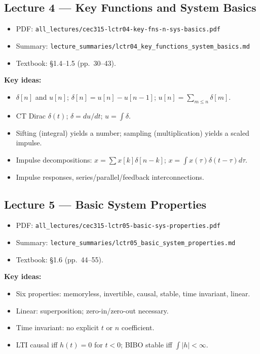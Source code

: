 \documentclass[11pt]{article}
\begin{document}
\subsection{Lecture 4 --- Key Functions and System Basics}
\begin{itemize}[leftmargin=*]
  \item PDF: \texttt{all\_lectures/cec315-lctr04-key-fns-n-sys-basics.pdf}
  \item Summary: \texttt{lecture\_summaries/lctr04\_key\_functions\_system\_basics.md}
  \item Textbook: \S 1.4--1.5 (pp.~30--43).
\end{itemize}
\textbf{Key ideas:}
\begin{itemize}[leftmargin=*]
  \item $\delta[n]$ and $u[n]$; $\delta[n]=u[n]-u[n-1]$; $u[n]=\sum_{m\le n}\delta[m]$.
  \item CT Dirac $\delta(t)$; $\delta=du/dt$; $u=\int\delta$.
  \item Sifting (integral) yields a number; sampling (multiplication) yields a scaled impulse.
  \item Impulse decompositions: $x=\sum x[k]\delta[n-k]$; $x=\int x(\tau)\delta(t-\tau)d\tau$.
  \item Impulse responses, series/parallel/feedback interconnections.
\end{itemize}

\subsection{Lecture 5 --- Basic System Properties}
\begin{itemize}[leftmargin=*]
  \item PDF: \texttt{all\_lectures/cec315-lctr05-basic-sys-properties.pdf}
  \item Summary: \texttt{lecture\_summaries/lctr05\_basic\_system\_properties.md}
  \item Textbook: \S 1.6 (pp.~44--55).
\end{itemize}
\textbf{Key ideas:}
\begin{itemize}[leftmargin=*]
  \item Six properties: memoryless, invertible, causal, stable, time invariant, linear.
  \item Linear: superposition; zero-in/zero-out necessary.
  \item Time invariant: no explicit $t$ or $n$ coefficient.
  \item LTI causal iff $h(t)=0$ for $t<0$; BIBO stable iff $\int|h|<\infty$.
\end{itemize}
\end{document}

